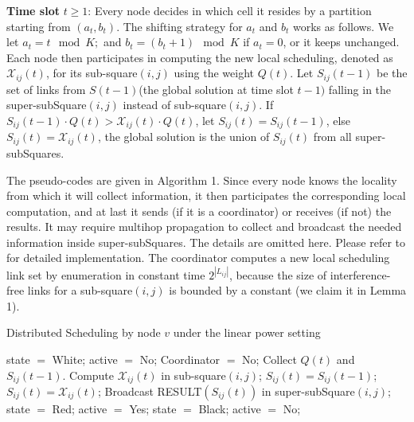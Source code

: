\documentclass[journal]{IEEEtran}
\begin{document}
\textbf{Time slot} $t \geq 1$: Every node decides in which cell
it resides by a partition starting from $(a_t, b_t )$. The shifting strategy for $a_t$ and $b_t$ works as follows. We let $a_t=t \mod K;$ and $b_t = (b_t+1) \mod K $ if $ a_t = 0$, or it keeps unchanged. Each node then participates in computing the new local scheduling, denoted as $\mathcal{X}_{ij} (t)$,
for its sub-square$(i,j)$ using the weight $Q(t)$. Let $S_{ij}(t-1)$ be the set of links from $S(t-1)$(the global solution at time slot $t-1)$ falling in the super-subSquare$(i,j)$ instead of sub-square$(i,j)$. If $S_{ij} (t-1)\cdot Q(t)>\mathcal{X}_{ij} (t)\cdot Q(t)$, let $S_{ij} (t)=S_{ij}(t-1)$, else $S_{ij} (t)=\mathcal{X}_{ij} (t)$, the global solution is the union
of $S_{ij} (t)$ from all super-subSquares.

The pseudo-codes are given in Algorithm 1. Since every node knows the locality from which it will collect information, it then participates the corresponding local computation, and at last it sends (if it is a coordinator) or receives (if not) the results. It may require multihop propagation to collect and broadcast the needed information inside super-subSquares. The details are omitted here. Please refer to \cite{brar-icdcs08} for detailed implementation.
The coordinator computes a new local scheduling link set by enumeration  in constant time $2^{|L_{ij}|}$, because the size of interference-free links for a sub-square$(i,j)$ is bounded by a constant (we claim it in Lemma 1).

\begin{algorithm}[htpb]
\caption{Distributed Scheduling by node $v$ under the linear power setting}
\label{alg1}
\begin{algorithmic}[1]
\STATE state $=$ White; active $= $ No; Coordinator $=$ No;
        \ENDIF
            \STATE Collect $Q(t) $ and $S_{ij}(t-1)$.
            \STATE Compute $\mathcal{X}_{ij}(t)$ in sub-square$(i,j)$;
                \STATE $S_{ij}(t)=S_{ij}(t-1)$;
                \ELSE
                    \STATE $S_{ij}(t)=\mathcal{X}_{ij}(t)$;
            \ENDIF
            \STATE Broadcast RESULT$(S_{ij}(t))$ in super-subSquare$(i,j)$;
        \ENDIF
                    \STATE state $=$ Red; active $=$ Yes;
                \ELSE
                    \STATE state $=$ Black; active $=$ No;
                \ENDIF
            \ENDIF
        \ENDIF
     \end{algorithmic}
\end{algorithm}
\end{document}
